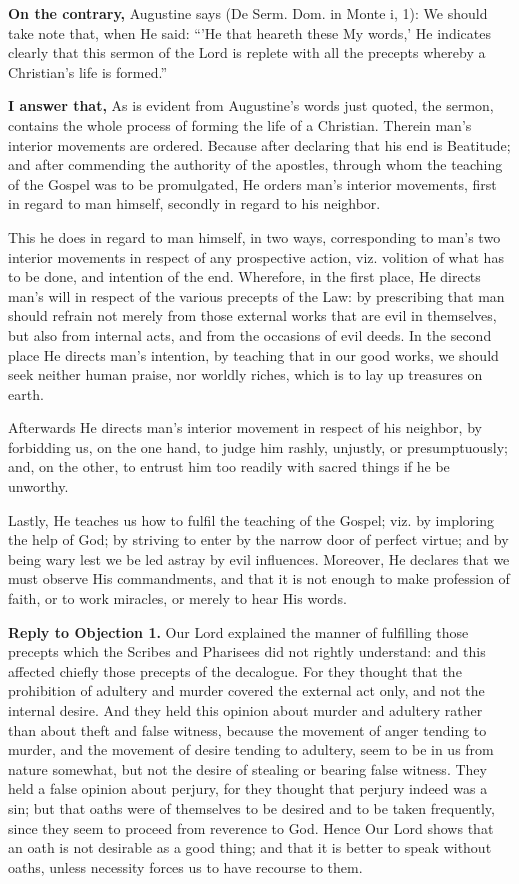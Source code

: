 \textbf{On the contrary,} Augustine says (De Serm. Dom. in Monte i, 1): We should take note that, when He said: ``'He that heareth these My words,' He indicates clearly that this sermon of the Lord is replete with all the precepts whereby a Christian's life is formed.''

\textbf{I answer that,} As is evident from Augustine's words just quoted, the sermon, contains the whole process of forming the life of a Christian. Therein man's interior movements are ordered. Because after declaring that his end is Beatitude; and after commending the authority of the apostles, through whom the teaching of the Gospel was to be promulgated, He orders man's interior movements, first in regard to man himself, secondly in regard to his neighbor.

This he does in regard to man himself, in two ways, corresponding to man's two interior movements in respect of any prospective action, viz. volition of what has to be done, and intention of the end. Wherefore, in the first place, He directs man's will in respect of the various precepts of the Law: by prescribing that man should refrain not merely from those external works that are evil in themselves, but also from internal acts, and from the occasions of evil deeds. In the second place He directs man's intention, by teaching that in our good works, we should seek neither human praise, nor worldly riches, which is to lay up treasures on earth.

Afterwards He directs man's interior movement in respect of his neighbor, by forbidding us, on the one hand, to judge him rashly, unjustly, or presumptuously; and, on the other, to entrust him too readily with sacred things if he be unworthy.

Lastly, He teaches us how to fulfil the teaching of the Gospel; viz. by imploring the help of God; by striving to enter by the narrow door of perfect virtue; and by being wary lest we be led astray by evil influences. Moreover, He declares that we must observe His commandments, and that it is not enough to make profession of faith, or to work miracles, or merely to hear His words.

\textbf{Reply to Objection 1.} Our Lord explained the manner of fulfilling those precepts which the Scribes and Pharisees did not rightly understand: and this affected chiefly those precepts of the decalogue. For they thought that the prohibition of adultery and murder covered the external act only, and not the internal desire. And they held this opinion about murder and adultery rather than about theft and false witness, because the movement of anger tending to murder, and the movement of desire tending to adultery, seem to be in us from nature somewhat, but not the desire of stealing or bearing false witness. They held a false opinion about perjury, for they thought that perjury indeed was a sin; but that oaths were of themselves to be desired and to be taken frequently, since they seem to proceed from reverence to God. Hence Our Lord shows that an oath is not desirable as a good thing; and that it is better to speak without oaths, unless necessity forces us to have recourse to them.

